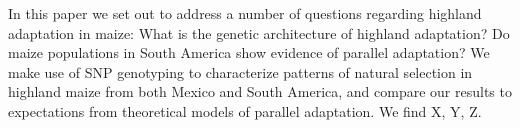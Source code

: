 In this paper we set out to address a number of questions regarding highland adaptation in maize: What is the genetic architecture of highland adaptation? Do maize populations in South America show evidence of parallel adaptation? 
We make use of SNP genotyping to characterize patterns of natural selection in highland maize from both Mexico and South America, and compare our results to expectations from theoretical models of parallel adaptation.  We find X, Y, Z.
